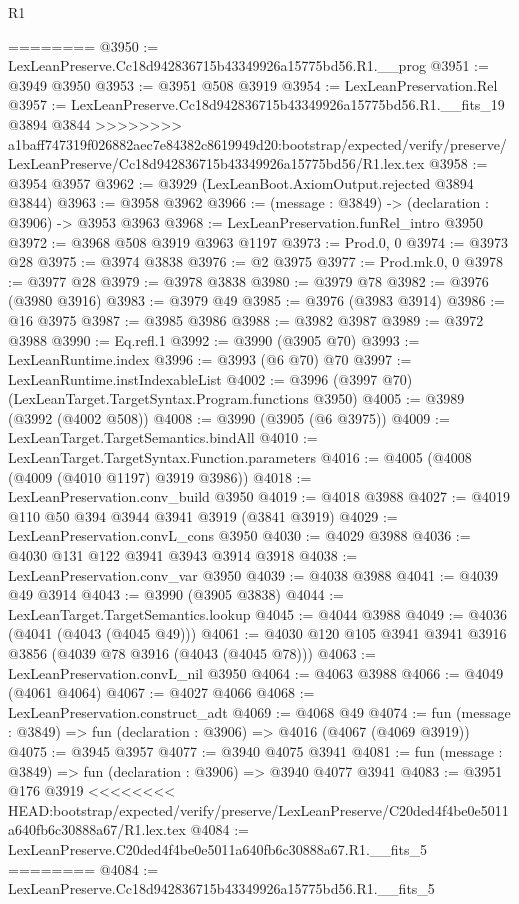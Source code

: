 \begin{lexlean}{R1}
\begin{coremodule}
{{{{{{{{{{{{{{{{{{{{{{{{{{{{{{{{{{{{{{{{{{{{{{{{{{{{{{{{{{{{{{{{{{{{{{{{{{{{{{{{{{{{{{{{{{{{{{{{{{{{{{{{{{{{{{{{{{{{{{{{{{{{{{{{{{{{{{{{{{{{{{{{{{{{{{{{{{{{{{{{{{{{{{{{{{{{{{{{{{{{{{{{{{========
@3950 := LexLeanPreserve.Cc18d942836715b43349926a15775bd56.R1.__prog
@3951 := @3949 @3950
@3953 := @3951 @508 @3919
@3954 := LexLeanPreservation.Rel
@3957 := LexLeanPreserve.Cc18d942836715b43349926a15775bd56.R1.__fits_19 @3894 @3844
>>>>>>>> a1baff747319f026882aec7e84382c8619949d20:bootstrap/expected/verify/preserve/LexLeanPreserve/Cc18d942836715b43349926a15775bd56/R1.lex.tex
@3958 := @3954 @3957
@3962 := @3929 (LexLeanBoot.AxiomOutput.rejected @3894 @3844)
@3963 := @3958 @3962
@3966 := (message : @3849) -> (declaration : @3906) -> @3953 @3963
@3968 := LexLeanPreservation.funRel_intro @3950
@3972 := @3968 @508 @3919 @3963 @1197
@3973 := Prod.{0, 0}
@3974 := @3973 @28
@3975 := @3974 @3838
@3976 := @2 @3975
@3977 := Prod.mk.{0, 0}
@3978 := @3977 @28
@3979 := @3978 @3838
@3980 := @3979 @78
@3982 := @3976 (@3980 @3916)
@3983 := @3979 @49
@3985 := @3976 (@3983 @3914)
@3986 := @16 @3975
@3987 := @3985 @3986
@3988 := @3982 @3987
@3989 := @3972 @3988
@3990 := Eq.refl.{1}
@3992 := @3990 (@3905 @70)
@3993 := LexLeanRuntime.index
@3996 := @3993 (@6 @70) @70
@3997 := LexLeanRuntime.instIndexableList
@4002 := @3996 (@3997 @70) (LexLeanTarget.TargetSyntax.Program.functions @3950)
@4005 := @3989 (@3992 (@4002 @508))
@4008 := @3990 (@3905 (@6 @3975))
@4009 := LexLeanTarget.TargetSemantics.bindAll
@4010 := LexLeanTarget.TargetSyntax.Function.parameters
@4016 := @4005 (@4008 (@4009 (@4010 @1197) @3919 @3986))
@4018 := LexLeanPreservation.conv_build @3950
@4019 := @4018 @3988
@4027 := @4019 @110 @50 @394 @3944 @3941 @3919 (@3841 @3919)
@4029 := LexLeanPreservation.convL_cons @3950
@4030 := @4029 @3988
@4036 := @4030 @131 @122 @3941 @3943 @3914 @3918
@4038 := LexLeanPreservation.conv_var @3950
@4039 := @4038 @3988
@4041 := @4039 @49 @3914
@4043 := @3990 (@3905 @3838)
@4044 := LexLeanTarget.TargetSemantics.lookup
@4045 := @4044 @3988
@4049 := @4036 (@4041 (@4043 (@4045 @49)))
@4061 := @4030 @120 @105 @3941 @3941 @3916 @3856 (@4039 @78 @3916 (@4043 (@4045 @78)))
@4063 := LexLeanPreservation.convL_nil @3950
@4064 := @4063 @3988
@4066 := @4049 (@4061 @4064)
@4067 := @4027 @4066
@4068 := LexLeanPreservation.construct_adt
@4069 := @4068 @49
@4074 := fun (message : @3849) => fun (declaration : @3906) => @4016 (@4067 (@4069 @3919))
@4075 := @3945 @3957
@4077 := @3940 @4075 @3941
@4081 := fun (message : @3849) => fun (declaration : @3906) => @3940 @4077 @3941
@4083 := @3951 @176 @3919
<<<<<<<< HEAD:bootstrap/expected/verify/preserve/LexLeanPreserve/C20ded4f4be0e5011a640fb6c30888a67/R1.lex.tex
@4084 := LexLeanPreserve.C20ded4f4be0e5011a640fb6c30888a67.R1.__fits_5
========
@4084 := LexLeanPreserve.Cc18d942836715b43349926a15775bd56.R1.__fits_5
}}}}}}}}}}}}}}}}}}}}}}}}}}}}}}}}}}}}}}}}}}}}}}}}}}}}}}}}}}}}}}}}}}}}}}}}}}}}}}}}}}}}}}}}}}}}}}}}}}}}}}}}}}}}}}}}}}}}}}}}}}}}}}}}}}}}}}}}}}}}}}}}}}}}}}}}}}}}}}}}}}}}}}}}}}}}}}}}}}}}}}}}}}
\end{coremodule}
\end{lexlean}
